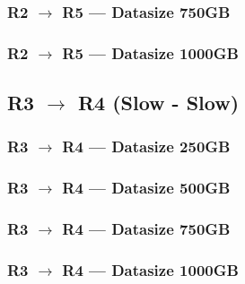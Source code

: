 \newpage
\subsubsection{R2 $\rightarrow$ R5 --- Datasize 750GB}



\newpage
\subsubsection{R2 $\rightarrow$ R5 --- Datasize 1000GB}



\newpage


\subsection{R3 $\rightarrow$ R4 (Slow - Slow)}
\subsubsection{R3 $\rightarrow$ R4 --- Datasize 250GB}



\newpage
\subsubsection{R3 $\rightarrow$ R4 --- Datasize 500GB}



\newpage
\subsubsection{R3 $\rightarrow$ R4 --- Datasize 750GB}



\newpage
\subsubsection{R3 $\rightarrow$ R4 --- Datasize 1000GB}



\newpage

